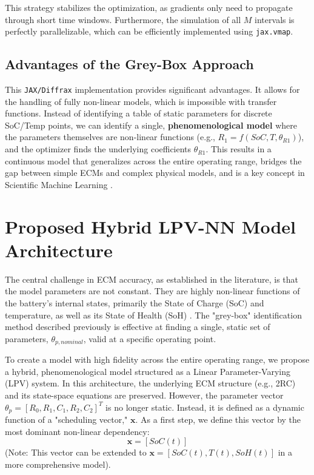 \documentclass[]{article}
\begin{document}
This strategy stabilizes the optimization, as gradients only need to propagate through short time windows. Furthermore, the simulation of all $M$ intervals is perfectly parallelizable, which can be efficiently implemented using \texttt{jax.vmap}.

\subsection{Advantages of the Grey-Box Approach}

This \texttt{JAX/Diffrax} implementation provides significant advantages. It allows for the handling of fully non-linear models, which is impossible with transfer functions. Instead of identifying a table of static parameters for discrete SoC/Temp points, we can identify a single, \textbf{phenomenological model} where the parameters themselves are non-linear functions (e.g., $R_1 = f(SoC, T, \theta_{R1})$), and the optimizer finds the underlying coefficients $\theta_{R1}$. This results in a continuous model that generalizes across the entire operating range, bridges the gap between simple ECMs and complex physical models, and is a key concept in Scientific Machine Learning \cite{rackauckas2020universal}.

\section{Proposed Hybrid LPV-NN Model Architecture}

The central challenge in ECM accuracy, as established in the literature, is that the model parameters are not constant. They are highly non-linear functions of the battery's internal states, primarily the State of Charge (SoC) and temperature, as well as its State of Health (SoH) \cite{tran2021comprehensive, yang2023improved}. The "grey-box" identification method described previously is effective at finding a single, static set of parameters, $\theta_{p, nominal}$, valid at a specific operating point.

To create a model with high fidelity across the entire operating range, we propose a hybrid, phenomenological model structured as a Linear Parameter-Varying (LPV) system. In this architecture, the underlying ECM structure (e.g., 2RC) and its state-space equations are preserved. However, the parameter vector $\theta_p = [R_0, R_1, C_1, R_2, C_2]^T$ is no longer static. Instead, it is defined as a dynamic function of a "scheduling vector," $\mathbf{x}$. As a first step, we define this vector by the most dominant non-linear dependency:
\begin{equation}
	\label{eq:scheduling_vector}
	\mathbf{x} = [SoC(t)]
\end{equation}
(Note: This vector can be extended to $\mathbf{x} = [SoC(t), T(t), SoH(t)]$ in a more comprehensive model).
\end{document}
